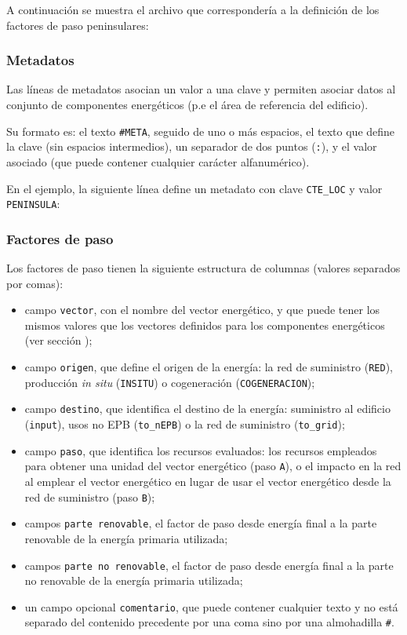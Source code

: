 \documentclass[10pt,notitlepage,oneside,a4paper]{article}
\begin{document}
A continuación se muestra el archivo que correspondería a la definición de los factores de paso peninsulares:



\subsubsection{Metadatos}

Las líneas de metadatos asocian un valor a una clave y permiten asociar datos al conjunto de componentes energéticos (p.e el área de referencia del edificio).

Su formato es: el texto \texttt{\#META}, seguido de uno o más espacios, el texto que define la clave (sin espacios intermedios), un separador de dos puntos (\texttt{:}), y el valor asociado (que puede contener cualquier carácter alfanumérico).

En el ejemplo, la siguiente línea define un metadato con clave \texttt{CTE\_LOC} y valor \texttt{PENINSULA}:



\subsubsection{Factores de paso}

Los factores de paso tienen la siguiente estructura de columnas (valores separados por comas):

\begin{itemize}
\item campo \texttt{vector}, con el nombre del vector energético, y que puede tener los mismos valores que los vectores definidos para los componentes energéticos (ver sección );
\item campo \texttt{origen}, que define el origen de la energía: la red de suministro (\texttt{RED}), producción \textit{in situ} (\texttt{INSITU}) o cogeneración (\texttt{COGENERACION});
\item campo \texttt{destino}, que identifica el destino de la energía: suministro al edificio (\texttt{input}), usos no EPB (\texttt{to\_nEPB}) o la red de suministro (\texttt{to\_grid});
\item campo \texttt{paso}, que identifica los recursos evaluados: los recursos empleados para obtener una unidad del vector energético (paso \texttt{A}), o el impacto en la red al emplear el vector energético en lugar de usar el vector energético desde la red de suministro (paso \texttt{B});
\item campos \texttt{parte renovable}, el factor de paso desde energía final a la parte renovable de la energía primaria utilizada;
\item campos \texttt{parte no renovable}, el factor de paso desde energía final a la parte no renovable de la energía primaria utilizada;
\item un campo opcional \texttt{comentario}, que puede contener cualquier texto y no está separado del contenido precedente por una coma sino por una almohadilla \texttt{\#}.
\end{itemize}
\end{document}
